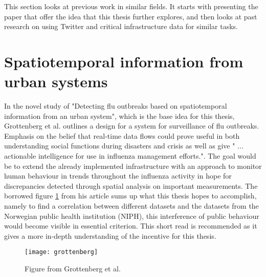 This section looks at previous work in similar fields. It starts with presenting the paper that offer the idea that this thesis further explores, and then looks at past research on using Twitter and critical infrastructure data for similar tasks.

\section{Spatiotemporal information from urban systems}
In the novel study of "Detecting flu outbreaks based on spatiotemporal information from an urban system", which is the base idea for this thesis, Grottenberg et al. \cite{spatiotemp_urban_sys} outlines a design for a system for surveillance of flu outbreaks. Emphasis on the belief that real-time data flows could prove useful in both understanding social functions during disasters and crisis as well as give " ... actionable intelligence for use in influenza management efforts.". The goal would be to extend the already implemented infrastructure with an approach to monitor human behaviour in trends throughout the influenza activity in hope for discrepancies detected through spatial analysis on important measurements. The borrowed figure \ref{fig:grottenberg} from his article sums up what this thesis hopes to accomplish, namely to find a correlation between different datasets and the datasets from the Norwegian public health institution (NIPH), this interference of public behaviour would become visible in essential criterion.
This short read \cite{spatiotemp_urban_sys} is recommended as it gives a more in-depth understanding of the incentive for this thesis.

\begin{figure}[h]
\texttt{[image: grottenberg]}
\centering
\caption{Figure from Grottenberg et al. \cite{spatiotemp_urban_sys}}
\label{fig:grottenberg}
\end{figure}


